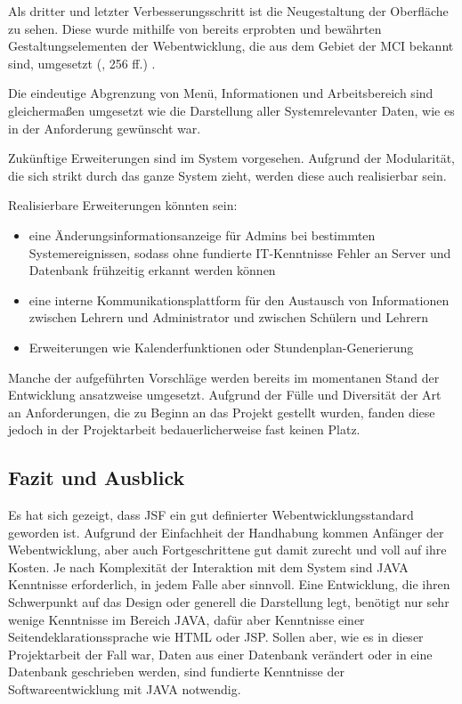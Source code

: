 Als dritter und letzter Verbesserungsschritt ist die Neugestaltung der Oberfläche zu sehen. Diese wurde mithilfe von bereits erprobten und bewährten Gestaltungselementen der Webentwicklung, die aus dem Gebiet der \ac{MCI} bekannt sind, umgesetzt (\cite{DahmM-GdMCI}, 256 ff.)  .

Die eindeutige Abgrenzung von Menü, Informationen und Arbeitsbereich sind gleichermaßen umgesetzt wie die Darstellung aller Systemrelevanter Daten, wie es in der Anforderung gewünscht war.

Zukünftige Erweiterungen sind im System vorgesehen. Aufgrund der Modularität, die sich strikt durch das ganze System zieht, werden diese auch realisierbar sein.

Realisierbare Erweiterungen könnten sein:
\begin{itemize}
  \item eine Änderungsinformationsanzeige für Admins bei bestimmten Systemereignissen, sodass ohne fundierte \ac{IT}-Kenntnisse Fehler an Server und Datenbank frühzeitig erkannt werden können
  \item eine interne Kommunikationsplattform für den Austausch von Informationen zwischen Lehrern und Administrator und zwischen Schülern und Lehrern  
  \item Erweiterungen wie Kalenderfunktionen oder Stundenplan-Generierung
\end{itemize}
  
Manche der aufgeführten Vorschläge werden bereits im momentanen Stand der Entwicklung ansatzweise umgesetzt. 
Aufgrund der Fülle und Diversität der Art an Anforderungen, die zu Beginn an das Projekt gestellt wurden, fanden diese jedoch in der Projektarbeit bedauerlicherweise fast keinen Platz.

\subsection{Fazit und Ausblick}

Es hat sich gezeigt, dass \ac{JSF} ein gut definierter Webentwicklungsstandard geworden ist.
Aufgrund der Einfachheit der Handhabung kommen Anfänger der Webentwicklung, aber auch Fortgeschrittene gut damit zurecht und voll auf ihre Kosten.
Je nach Komplexität der Interaktion mit dem System sind JAVA Kenntnisse erforderlich, in jedem Falle aber sinnvoll. 
Eine Entwicklung, die ihren Schwerpunkt auf das Design oder generell die Darstellung legt, benötigt nur sehr wenige Kenntnisse im Bereich JAVA, dafür aber Kenntnisse einer Seitendeklarationssprache wie HTML oder JSP.
Sollen aber, wie es in dieser Projektarbeit der Fall war, Daten aus einer Datenbank verändert oder in eine Datenbank geschrieben werden, sind fundierte Kenntnisse der Softwareentwicklung mit JAVA notwendig.

